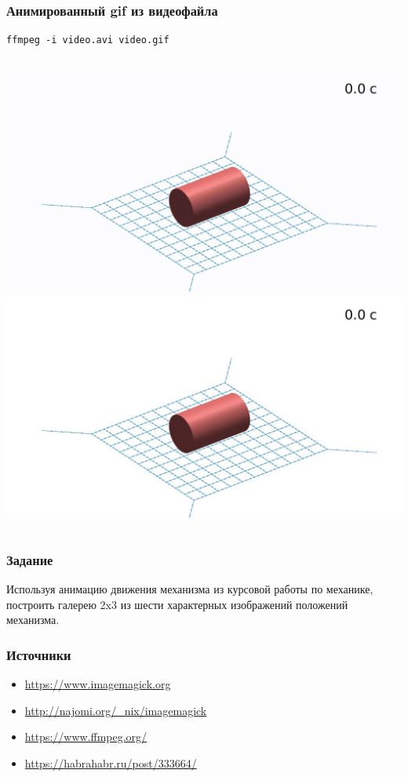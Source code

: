 \documentclass[11pt, compress]{beamer}
\begin{document}
\begin{frame}[c,fragile]
\frametitle{Анимированный gif из видеофайла}
\begin{lstlisting}
ffmpeg -i video.avi video.gif 
\end{lstlisting}
\begin{columns}
\includegraphics[width=1\textwidth]{net_gif.png}
\includegraphics[width=1\textwidth]{net_0.png}
\end{columns}
\end{frame}


\begin{frame}[c]
\frametitle{Задание}
Используя анимацию движения механизма из курсовой работы по механике, построить галерею 2x3 из шести характерных изображений положений механизма.
\end{frame}

\begin{frame}[c]
\frametitle{Источники}
\begin{itemize}
	\item \url{https://www.imagemagick.org}	
	\item \url{http://najomi.org/_nix/imagemagick}
	\item \url{https://www.ffmpeg.org/}
	\item \url{https://habrahabr.ru/post/333664/}	
\end{itemize}	
\end{frame}
\end{document}
